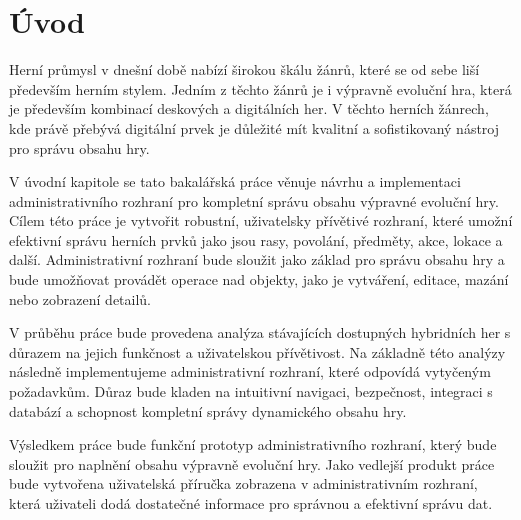 \chapter{Úvod}
\label{ch:introduction}

Herní průmysl v dnešní době nabízí širokou škálu žánrů, které se od sebe liší především herním stylem. Jedním z těchto žánrů je i výpravně evoluční hra, která je především kombinací deskových a digitálních her. V těchto herních žánrech, kde právě přebývá digitální prvek je důležité mít kvalitní a sofistikovaný nástroj pro správu obsahu hry.

V úvodní kapitole se tato bakalářská práce věnuje návrhu a implementaci administrativního rozhraní pro kompletní správu obsahu výpravné evoluční hry. Cílem této práce je vytvořit robustní, uživatelsky přívětivé rozhraní, které umožní efektivní správu herních prvků jako jsou rasy, povolání, předměty, akce, lokace a další. Administrativní rozhraní bude sloužit jako základ pro správu obsahu hry a bude umožňovat provádět operace nad objekty, jako je vytváření, editace, mazání nebo zobrazení detailů.

V průběhu práce bude provedena analýza stávajících dostupných hybridních her s důrazem na jejich funkčnost a uživatelskou přívětivost. Na základně této analýzy následně implementujeme administrativní rozhraní, které odpovídá vytyčeným požadavkům. Důraz bude kladen na intuitivní navigaci, bezpečnost, integraci s databází a schopnost kompletní správy dynamického obsahu hry.

Výsledkem práce bude funkční prototyp administrativního rozhraní, který bude sloužit pro naplnění obsahu výpravně evoluční hry. Jako vedlejší produkt práce bude vytvořena uživatelská příručka zobrazena v administrativním rozhraní, která uživateli dodá dostatečné informace pro správnou a efektivní správu dat.

\endinput